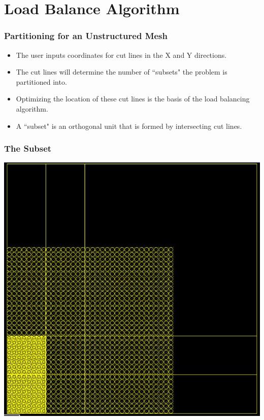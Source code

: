 \documentclass[compress]{beamer}
\begin{document}
\section{Load Balance Algorithm}

\begin{frame}[t]\frametitle{Partitioning for an Unstructured Mesh}
\begin{block}{}
	\begin{itemize}
	\item The user inputs coordinates for cut lines in the X and Y directions.
	\item The cut lines will determine the number of ``subsets" the problem is partitioned into.
	\item Optimizing the location of these cut lines is the basis of the load balancing algorithm.
	\item A ``subset" is an orthogonal unit that is formed by intersecting cut lines.
	\end{itemize}
\end{block}
\end{frame}

\begin{frame}[t]\frametitle{The Subset}
\centering
\includegraphics[width = 12 cm, height = 7 cm ]{figures/subsetlattice.png}
\end{frame}
\end{document}
